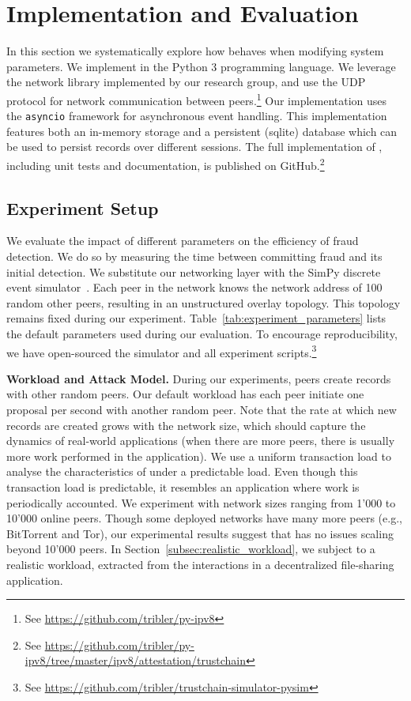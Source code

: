 \section{Implementation and Evaluation}
\label{sec:implementation_evaluation}
In this section we systematically explore how \TrustChain{} behaves when modifying system parameters.
We implement \TrustChain{} in the Python 3 programming language.
We leverage the network library implemented by our research group, and use the UDP protocol for network communication between peers.\footnote{See \url{https://github.com/tribler/py-ipv8}}
Our implementation uses the \texttt{asyncio} framework for asynchronous event handling.
This implementation features both an in-memory storage and a persistent (sqlite) database which can be used to persist records over different sessions.
The full implementation of \TrustChain{}, including unit tests and documentation, is published on GitHub.\footnote{See \url{https://github.com/tribler/py-ipv8/tree/master/ipv8/attestation/trustchain}}

\subsection{Experiment Setup}
We evaluate the impact of different parameters on the efficiency of fraud detection.
We do so by measuring the time between committing fraud and its initial detection.
We substitute our networking layer with the SimPy discrete event simulator~\cite{matloff2008introduction}.
Each peer in the \TrustChain{} network knows the network address of 100 random other peers, resulting in an unstructured overlay topology.
This topology remains fixed during our experiment.
Table~\ref{tab:experiment_parameters} lists the default parameters used during our evaluation.
To encourage reproducibility, we have open-sourced the \TrustChain{} simulator and all experiment scripts.\footnote{See \url{https://github.com/tribler/trustchain-simulator-pysim}}

\textbf{Workload and Attack Model.}
During our experiments, peers create records with other random peers.
Our default workload has each peer initiate one proposal per second with another random peer.
Note that the rate at which new records are created grows with the network size, which should capture the dynamics of real-world applications (when there are more peers, there is usually more work performed in the application).
We use a uniform transaction load to analyse the characteristics of \TrustChain{} under a predictable load.
Even though this transaction load is predictable, it resembles an application where work is periodically accounted.
We experiment with network sizes ranging from 1'000 to 10'000 online peers.
Though some deployed networks have many more peers (e.g., BitTorrent and Tor), our experimental results suggest that \TrustChain{} has no issues scaling beyond 10'000 peers.
In Section~\ref{subsec:realistic_workload}, we subject \TrustChain{} to a realistic workload, extracted from the interactions in a decentralized file-sharing application.

